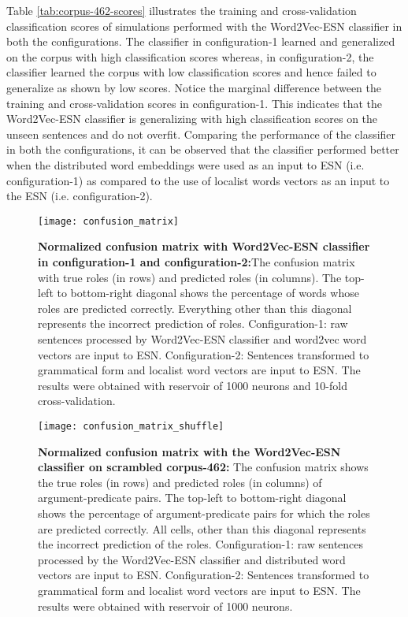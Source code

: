Table \ref{tab:corpus-462-scores} illustrates the training and cross-validation classification scores of simulations performed with the Word2Vec-ESN classifier in both the configurations. The classifier in configuration-1 learned and generalized on the corpus with high classification scores whereas, in configuration-2, the classifier learned the corpus with low classification scores and hence failed to generalize as shown by low scores. Notice the marginal difference between the training and cross-validation scores in configuration-1. This indicates that the Word2Vec-ESN classifier is generalizing with high classification scores on the unseen sentences and do not overfit. Comparing the performance of the classifier in both the configurations, it can be observed that the classifier performed better when the distributed word embeddings were used as an input to ESN (i.e. configuration-1) as compared to the use of localist words vectors as an input to the ESN (i.e. configuration-2).

\begin{figure}[hbtp]
\centering
\texttt{[image: confusion\_matrix]}
\caption[Normalized confusion matrix for unscrambled corpus-462.] {\textbf{Normalized confusion matrix with Word2Vec-ESN classifier in configuration-1 and configuration-2:}{\small The confusion matrix with true roles (in rows) and predicted roles (in columns). The top-left to bottom-right diagonal shows the percentage of words whose roles are predicted correctly. Everything other than this diagonal represents the incorrect prediction of roles. Configuration-1: raw sentences processed by Word2Vec-ESN classifier and word2vec word vectors are input to ESN. Configuration-2: Sentences transformed to grammatical form and localist word vectors are input to ESN. The results were obtained with reservoir of 1000 neurons and 10-fold cross-validation.}}
\label{fig:confusion_matrix}
\end{figure}

\begin{figure}[hbtp]
\centering
\texttt{[image: confusion\_matrix\_shuffle]}
\caption[Normalized confusion matrix for scrambled corpus-462.] {\textbf{Normalized confusion matrix with the Word2Vec-ESN classifier on scrambled corpus-462: } {\small The confusion matrix shows the true roles (in rows) and predicted roles (in columns) of argument-predicate pairs. The top-left to bottom-right diagonal shows the percentage of argument-predicate pairs for which the roles are predicted correctly. All cells, other than this diagonal represents the incorrect prediction of the roles. Configuration-1: raw sentences processed by the Word2Vec-ESN classifier and distributed word vectors are input to ESN. Configuration-2: Sentences transformed to grammatical form and localist word vectors are input to ESN. The results were obtained with reservoir of 1000 neurons.}}
\label{fig:confusion_matrix_shuffle}
\end{figure}

